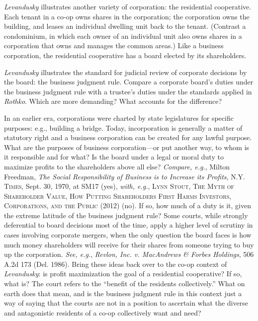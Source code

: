 \item \textit{Levandusky} illustrates another variety of corporation: the
residential cooperative. Each tenant in a co-op owns shares in the corporation;
the corporation owns the building, and leases an individual dwelling unit back
to the tenant. (Contrast a condominium, in which each owner of an individual
unit also owns shares in a corporation that owns and manages the common areas.)
Like a business corporation, the residential cooperative has a board elected by
its shareholders.

\item \textit{Levandusky} illustrates the standard for judicial review of
corporate decisions by the board: the business judgment rule. Compare a
corporate board's duties under the business judgment rule with a trustee's
duties under the standards applied in \textit{Rothko}. Which are more demanding?
What accounts for the difference?

\item In an earlier era, corporations were charted by state legislatures for
specific purposes: e.g., building a bridge. Today, incorporation is generally a
matter of statutory right and a business corporation can be created for any
lawful purpose. What are the purposes of business corporation---or put another
way, to whom is it responsible and for what? Is the board under a legal or moral
duty to maximize profits to the shareholders above all else? \textit{Compare,
e.g.}, Milton Freedman, \textit{The Social Responsibility of Business is to
Increase its Profits}, \textsc{N.Y. Times}, Sept. 30, 1970, at SM17 (yes),
\textit{with, e.g.}, \textsc{Lynn Stout}, \textsc{The Myth of Shareholder Value,
How Putting Shareholders First Harms Investors, Corporations, and the Public}
(2012) (no). If so, how much of a duty is it, given the extreme latitude of the
business judgment rule? Some courts, while strongly deferential to board
decisions most of the time, apply a higher level of scrutiny in cases involving
corporate mergers, when the only question the board faces is how much money
shareholders will receive for their shares from someone trying to buy up the
corporation. \textit{See, e.g.}, \textit{Revlon, Inc. v. MacAndrews \& Forbes
Holdings}, 506 A.2d 173 (Del. 1986). Bring these ideas back over to the co-op
context of \textit{Levandusky}: is profit maximization the goal of a residential
cooperative? If so, what is? The court refers to the ``benefit of the residents
collectively.'' What on earth does that mean, and is the business judgment rule
in this context just a way of saying that the courts are not in a position to
ascertain what the diverse and antagonistic residents of a co-op collectively
want and need?

